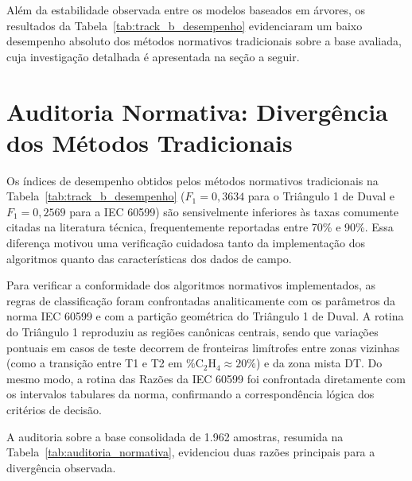 Além da estabilidade observada entre os modelos baseados em árvores, os resultados da Tabela~\ref{tab:track_b_desempenho} evidenciaram um baixo desempenho absoluto dos métodos normativos tradicionais sobre a base avaliada, cuja investigação detalhada é apresentada na seção a seguir.

\section{Auditoria Normativa: Divergência dos Métodos Tradicionais}\label{sec:res_auditoria}

Os índices de desempenho obtidos pelos métodos normativos tradicionais na Tabela~\ref{tab:track_b_desempenho} ($F_1 = 0,3634$ para o Triângulo 1 de Duval e $F_1 = 0,2569$ para a IEC 60599) são sensivelmente inferiores às taxas comumente citadas na literatura técnica, frequentemente reportadas entre 70\% e 90\%. Essa diferença motivou uma verificação cuidadosa tanto da implementação dos algoritmos quanto das características dos dados de campo.

Para verificar a conformidade dos algoritmos normativos implementados, as regras de classificação foram confrontadas analiticamente com os parâmetros da norma IEC 60599 e com a partição geométrica do Triângulo 1 de Duval. A rotina do Triângulo 1 reproduziu as regiões canônicas centrais, sendo que variações pontuais em casos de teste decorrem de fronteiras limítrofes entre zonas vizinhas (como a transição entre T1 e T2 em $\% \text{C}_2\text{H}_4 \approx 20\%$) e da zona mista DT. Do mesmo modo, a rotina das Razões da IEC 60599 foi confrontada diretamente com os intervalos tabulares da norma, confirmando a correspondência lógica dos critérios de decisão.

A auditoria sobre a base consolidada de 1.962 amostras, resumida na Tabela~\ref{tab:auditoria_normativa}, evidenciou duas razões principais para a divergência observada.

